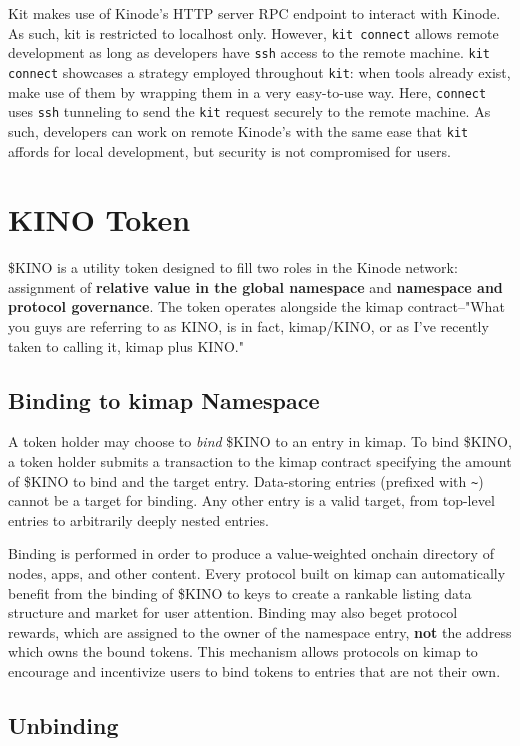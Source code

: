 \documentclass[runningheads]{llncs}
\begin{document}
Kit makes use of Kinode's HTTP server RPC endpoint to interact with Kinode.
As such, kit is restricted to localhost only.
However, \verb|kit connect| allows remote development as long as developers have \verb|ssh| access to the remote machine.
\verb|kit connect| showcases a strategy employed throughout \verb|kit|: when tools already exist, make use of them by wrapping them in a very easy-to-use way.
Here, \verb|connect| uses \verb|ssh| tunneling to send the \verb|kit| request securely to the remote machine.
As such, developers can work on remote Kinode's with the same ease that \verb|kit| affords for local development, but security is not compromised for users.

%
%
%
\section{KINO Token}

\$KINO is a utility token designed to fill two roles in the Kinode network: assignment of \textbf{relative value in the global namespace} and \textbf{namespace and protocol governance}.
The token operates alongside the kimap contract–"What you guys are referring to as KINO, is in fact, kimap/KINO, or as I've recently taken to calling it, kimap plus KINO."

\subsection{Binding to kimap Namespace}

A token holder may choose to \textit{bind} \$KINO to an entry in kimap.
To bind \$KINO, a token holder submits a transaction to the kimap contract specifying the amount of \$KINO to bind and the target entry.
Data-storing entries (prefixed with \verb|~|) cannot be a target for binding.
Any other entry is a valid target, from top-level entries to arbitrarily deeply nested entries.

Binding is performed in order to produce a value-weighted onchain directory of nodes, apps, and other content.
Every protocol built on kimap can automatically benefit from the binding of \$KINO to keys to create a rankable listing data structure and market for user attention.
Binding may also beget protocol rewards, which are assigned to the owner of the namespace entry, \textbf{not} the address which owns the bound tokens.
This mechanism allows protocols on kimap to encourage and incentivize users to bind tokens to entries that are not their own.

\subsection{Unbinding}
\end{document}
